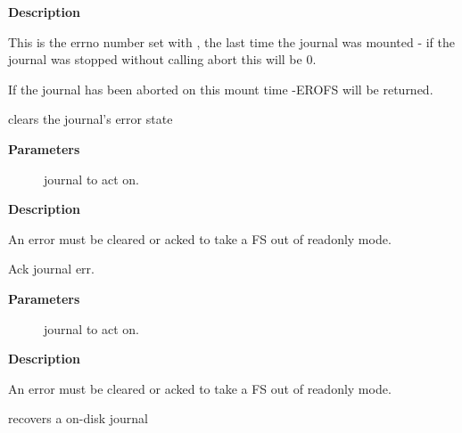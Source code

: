 \documentclass[a4paper,8pt,english]{sphinxmanual}
\begin{document}
\textbf{Description}

This is the errno number set with {\hyperref[filesystems/index:c.jbd2_journal_abort]{\emph{}}}, the last
time the journal was mounted - if the journal was stopped
without calling abort this will be 0.

If the journal has been aborted on this mount time -EROFS will
be returned.

\begin{fulllineitems}
\label{filesystems/index:c.jbd2_journal_clear_err}
clears the journal's error state

\end{fulllineitems}


\textbf{Parameters}
\begin{description}
\item[{}] \leavevmode
journal to act on.

\end{description}

\textbf{Description}

An error must be cleared or acked to take a FS out of readonly
mode.

\begin{fulllineitems}
\label{filesystems/index:c.jbd2_journal_ack_err}
Ack journal err.

\end{fulllineitems}


\textbf{Parameters}
\begin{description}
\item[{}] \leavevmode
journal to act on.

\end{description}

\textbf{Description}

An error must be cleared or acked to take a FS out of readonly
mode.

\begin{fulllineitems}
\label{filesystems/index:c.jbd2_journal_recover}
recovers a on-disk journal

\end{fulllineitems}
\end{document}
